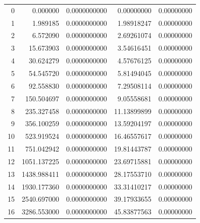 \label{tab:vert}
%
\tablelasttail{\hline \hline}
\begin{center}
\begin{xtabular}{|r||rr||rr|}
 0 &     0.000000  & 0.0000000000 &        0.00000000 & 0.00000000 \\
 1 &     1.989185  & 0.0000000000 &        1.98918247 & 0.00000000 \\
 2 &     6.572090  & 0.0000000000 &        2.69261074 & 0.00000000 \\
 3 &    15.673903  & 0.0000000000 &        3.54616451 & 0.00000000 \\
 4 &    30.624279  & 0.0000000000 &        4.57676125 & 0.00000000 \\
 5 &    54.545720  & 0.0000000000 &        5.81494045 & 0.00000000 \\
 6 &    92.558830  & 0.0000000000 &        7.29508114 & 0.00000000 \\
 7 &   150.504697  & 0.0000000000 &        9.05558681 & 0.00000000 \\
 8 &   235.327458  & 0.0000000000 &       11.13899899 & 0.00000000 \\
 9 &   356.100259  & 0.0000000000 &       13.59204197 & 0.00000000 \\
10 &   523.919524  & 0.0000000000 &       16.46557617 & 0.00000000 \\
11 &   751.042942  & 0.0000000000 &       19.81443787 & 0.00000000 \\
12 &  1051.137225  & 0.0000000000 &       23.69715881 & 0.00000000 \\
13 &  1438.988411  & 0.0000000000 &       28.17553710 & 0.00000000 \\
14 &  1930.177360  & 0.0000000000 &       33.31410217 & 0.00000000 \\
15 &  2540.697000  & 0.0000000000 &       39.17933655 & 0.00000000 \\
16 &  3286.553000  & 0.0000000000 &       45.83877563 & 0.00000000 \\

\end{xtabular}
\end{center}
